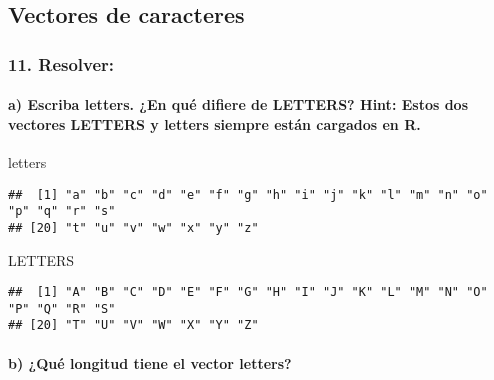 \documentclass[
]{article}
\newenvironment{Shaded}{\begin{snugshade}}{\end{snugshade}}
\newcommand{\NormalTok}[1]{#1}
\begin{document}
\hypertarget{vectores-de-caracteres}{%
\subsection{\texorpdfstring{\textbf{Vectores de
caracteres}}{Vectores de caracteres}}\label{vectores-de-caracteres}}

\hypertarget{resolver-1}{%
\subsubsection{11. Resolver:}\label{resolver-1}}

\hypertarget{a-escriba-letters.-en-quuxe9-difiere-de-letters-hint-estos-dos-vectores-letters-y-letters-siempre-estuxe1n-cargados-en-r.}{%
\paragraph{a) Escriba letters. ¿En qué difiere de LETTERS? Hint: Estos
dos vectores LETTERS y letters siempre están cargados en
R.}\label{a-escriba-letters.-en-quuxe9-difiere-de-letters-hint-estos-dos-vectores-letters-y-letters-siempre-estuxe1n-cargados-en-r.}}

\begin{Shaded}
\begin{Highlighting}[]
\NormalTok{letters}
\end{Highlighting}
\end{Shaded}

\begin{verbatim}
##  [1] "a" "b" "c" "d" "e" "f" "g" "h" "i" "j" "k" "l" "m" "n" "o" "p" "q" "r" "s"
## [20] "t" "u" "v" "w" "x" "y" "z"
\end{verbatim}

\begin{Shaded}
\begin{Highlighting}[]
\NormalTok{LETTERS}
\end{Highlighting}
\end{Shaded}

\begin{verbatim}
##  [1] "A" "B" "C" "D" "E" "F" "G" "H" "I" "J" "K" "L" "M" "N" "O" "P" "Q" "R" "S"
## [20] "T" "U" "V" "W" "X" "Y" "Z"
\end{verbatim}

\hypertarget{b-quuxe9-longitud-tiene-el-vector-letters}{%
\paragraph{b) ¿Qué longitud tiene el vector
letters?}\label{b-quuxe9-longitud-tiene-el-vector-letters}}
\end{document}
